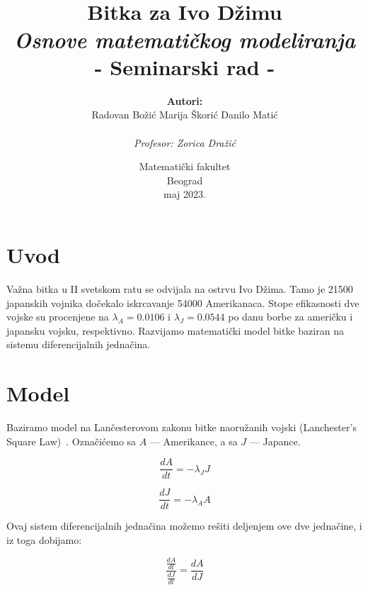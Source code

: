 \documentclass{article}
\title{ \normalsize \textsc{}
		\\ [2.0cm]
    \HRule{1.5pt} \\ [0.5cm]
		\LARGE \textbf{{Bitka za Ivo Džimu}}
    \HRule{1.5pt} \\[5pt] 
        \textit{Osnove matematičkog modeliranja} \\
        {- Seminarski rad -}\vspace*{9\baselineskip}
		}
\date{Matematički fakultet \\ Beograd \\ maj 2023.}
\author{\textbf{Autori:} \\[5pt]
    \Large{Radovan Božić \qquad Marija Škorić \qquad Danilo Matić} \\ \\
  \textit{Profesor: Zorica Dražić}}
\begin{document}

\maketitle
\thispagestyle{empty}
\newpage

\tableofcontents
{}
\newpage


\section{Uvod}

\hspace*{5mm}
Važna bitka u II svetskom ratu se odvijala na ostrvu Ivo Džima. Tamo je 21500
japanskih vojnika dočekalo iskrcavanje 54000 Amerikanaca.  Stope efikasnosti dve
vojske su procenjene na \(\lambda_A = 0.0106\) i \(\lambda_J = 0.0544\) po danu
borbe za američku i japansku vojsku, respektivno. Razvijamo matematički model
bitke baziran na sistemu diferencijalnih jednačina.



\section{Model}

\hspace*{5mm}
Baziramo model na Lančesterovom zakonu bitke naoružanih vojski (Lanchester’s
Square Law)~\cite{wiki}. Označićemo sa \(A\) --- Amerikance, a sa \(J\) --- Japance.

\begin{equation}\label{pocetna_A}
\frac{dA}{dt} = - \lambda_{J}J
\end{equation}

\begin{equation}\label{pocetna_J}
\frac{dJ}{dt} = - \lambda_{A}A
\end{equation}


Ovaj sistem diferencijalnih jednačina možemo rešiti deljenjem ove dve jednačine,
i iz toga dobijamo:

\[
  \frac{\displaystyle \frac{\displaystyle dA}{\displaystyle dt}}{\displaystyle  \frac{\displaystyle dJ}{\displaystyle dt} } = \frac{\displaystyle dA}{\displaystyle dJ}
\]
\end{document}
